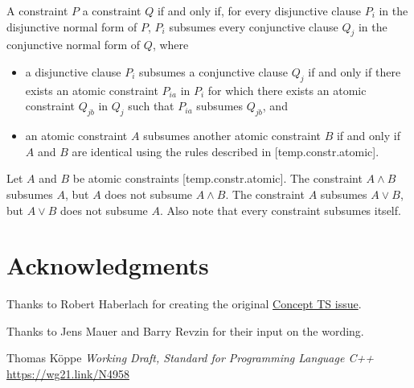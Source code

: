 \documentclass{wg21}
\begin{document}
\pnum
A constraint $P$  a constraint $Q$
if and only if,
for every disjunctive clause $P_i$
in the disjunctive normal form
of $P$, $P_i$ subsumes every conjunctive clause $Q_j$
in the conjunctive normal form of $Q$, where
\begin{itemize}
    \item
    a disjunctive clause $P_i$ subsumes a conjunctive clause $Q_j$ if and only
    if there exists an atomic constraint $P_{ia}$ in $P_i$ for which there exists
    an atomic constraint $Q_{jb}$ in $Q_j$ such that $P_{ia}$ subsumes $Q_{jb}$, and

    \item an atomic constraint $A$ subsumes another atomic constraint
    $B$ if and only if $A$ and $B$ are identical using the
    rules described in [temp.constr.atomic].

\end{itemize}
%
\begin{example}
    Let $A$ and $B$ be atomic constraints [temp.constr.atomic].
    The constraint $A \land B$ subsumes $A$, but $A$ does not subsume $A \land B$.
    The constraint $A$ subsumes $A \lor B$, but $A \lor B$ does not subsume $A$.
    Also note that every constraint subsumes itself.
\end{example}


\section{Acknowledgments}

Thanks to Robert Haberlach for creating the original  \href{http://cplusplus.github.io/concepts-ts/ts-active.html#28}{Concept TS issue}.

Thanks to Jens Mauer and Barry Revzin for their input on the wording.





\renewcommand{\section}[2]{}%

\begin{thebibliography}{9}

Thomas Köppe
\emph{Working Draft, Standard for Programming Language C++}\newline
\url{https://wg21.link/N4958}


\end{thebibliography}
\end{document}
